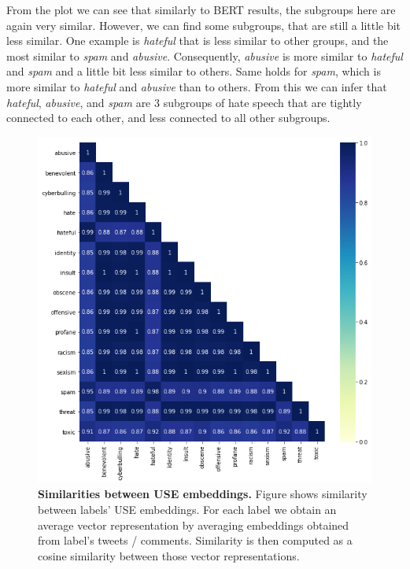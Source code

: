 \documentclass[fleqn,moreauthors,10pt]{ds_report}
\begin{document}
From the plot we can see that similarly to BERT results, the subgroups here are again very similar. However, we can find some subgroups, that are still a little bit less similar. One example is \textit{hateful} that is less similar to other groups, and the most similar to \textit{spam} and \textit{abusive}. Consequently, \textit{abusive} is more similar to \textit{hateful} and \textit{spam} and a little bit less similar to others. Same holds for \textit{spam}, which is more similar to  \textit{hateful} and \textit{abusive} than to others. From this we can infer that  \textit{hateful}, \textit{abusive}, and \textit{spam} are $3$ subgroups of hate speech that are tightly connected to each other, and less connected to all other subgroups.
\begin{figure}[htb]\centering
	\includegraphics[width=0.9\linewidth]{use_sim.png}
	\caption{\textbf{Similarities between USE embeddings.} Figure shows similarity between labels' USE embeddings. For each label we obtain an average vector representation by averaging embeddings obtained from label's tweets / comments. Similarity is  then computed as a cosine similarity between those vector representations.}
	\label{fig:use_sim}
\end{figure}


\end{document}

